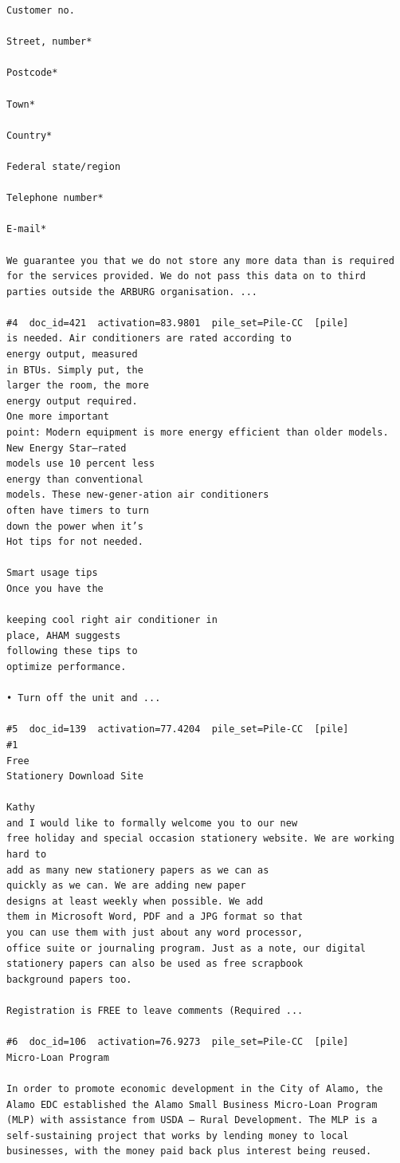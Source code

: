 \begin{verbatim}
Customer no.

Street, number*

Postcode*

Town*

Country*

Federal state/region

Telephone number*

E-mail*

We guarantee you that we do not store any more data than is required for the services provided. We do not pass this data on to third parties outside the ARBURG organisation. ...

#4  doc_id=421  activation=83.9801  pile_set=Pile-CC  [pile]
is needed. Air conditioners are rated according to
energy output, measured
in BTUs. Simply put, the
larger the room, the more
energy output required.
One more important
point: Modern equipment is more energy efficient than older models.
New Energy Star–rated
models use 10 percent less
energy than conventional
models. These new-gener-ation air conditioners
often have timers to turn
down the power when it’s
Hot tips for not needed.

Smart usage tips
Once you have the

keeping cool right air conditioner in
place, AHAM suggests
following these tips to
optimize performance.

• Turn off the unit and ...

#5  doc_id=139  activation=77.4204  pile_set=Pile-CC  [pile]
#1
Free
Stationery Download Site

Kathy
and I would like to formally welcome you to our new
free holiday and special occasion stationery website. We are working hard to
add as many new stationery papers as we can as
quickly as we can. We are adding new paper
designs at least weekly when possible. We add
them in Microsoft Word, PDF and a JPG format so that
you can use them with just about any word processor,
office suite or journaling program. Just as a note, our digital
stationery papers can also be used as free scrapbook
background papers too.

Registration is FREE to leave comments (Required ...

#6  doc_id=106  activation=76.9273  pile_set=Pile-CC  [pile]
Micro-Loan Program

In order to promote economic development in the City of Alamo, the Alamo EDC established the Alamo Small Business Micro-Loan Program (MLP) with assistance from USDA – Rural Development. The MLP is a self-sustaining project that works by lending money to local businesses, with the money paid back plus interest being reused.


\end{verbatim}
